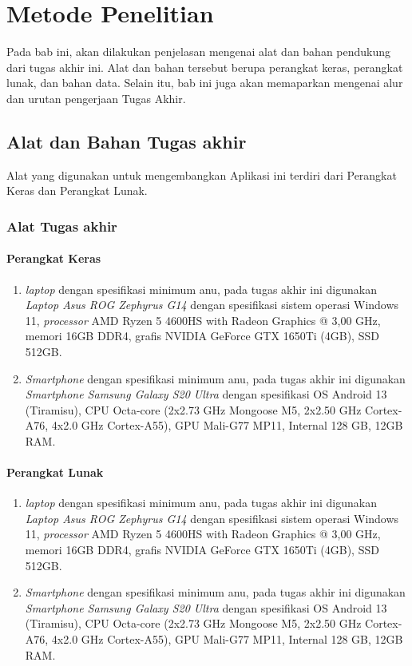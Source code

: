 \chapter{Metode Penelitian}
Pada bab ini, akan dilakukan penjelasan mengenai alat dan bahan pendukung dari tugas akhir ini.
Alat dan bahan tersebut berupa perangkat keras, perangkat lunak, dan bahan data.
Selain itu, bab ini juga akan memaparkan mengenai alur dan urutan pengerjaan Tugas Akhir.
\section{Alat dan Bahan Tugas akhir}
Alat yang digunakan untuk mengembangkan Aplikasi ini terdiri dari Perangkat Keras dan Perangkat Lunak.
\subsection{Alat Tugas akhir}
\subsubsection{Perangkat Keras}
\begin{enumerate}
	\item \textit{laptop} dengan spesifikasi minimum anu, 
	pada tugas akhir ini digunakan \textit{Laptop Asus ROG Zephyrus G14} dengan spesifikasi sistem operasi Windows 11, \textit{processor} AMD Ryzen 5 4600HS with Radeon Graphics @ 3,00 GHz, memori 16GB DDR4, grafis NVIDIA GeForce GTX 1650Ti (4GB), SSD 512GB.
	\item \textit{Smartphone} dengan spesifikasi minimum anu, pada tugas akhir ini digunakan \textit{Smartphone Samsung Galaxy S20 Ultra} dengan spesifikasi OS Android 13 (Tiramisu), CPU Octa-core (2x2.73 GHz Mongoose M5, 2x2.50 GHz Cortex-A76, 4x2.0 GHz Cortex-A55), GPU Mali-G77 MP11, Internal 128 GB, 12GB RAM.
\end{enumerate}

\subsubsection{Perangkat Lunak}
\begin{enumerate}
	\item \textit{laptop} dengan spesifikasi minimum anu, 
	pada tugas akhir ini digunakan \textit{Laptop Asus ROG Zephyrus G14} dengan spesifikasi sistem operasi Windows 11, \textit{processor} AMD Ryzen 5 4600HS with Radeon Graphics @ 3,00 GHz, memori 16GB DDR4, grafis NVIDIA GeForce GTX 1650Ti (4GB), SSD 512GB.
	\item \textit{Smartphone} dengan spesifikasi minimum anu, pada tugas akhir ini digunakan \textit{Smartphone Samsung Galaxy S20 Ultra} dengan spesifikasi OS Android 13 (Tiramisu), CPU Octa-core (2x2.73 GHz Mongoose M5, 2x2.50 GHz Cortex-A76, 4x2.0 GHz Cortex-A55), GPU Mali-G77 MP11, Internal 128 GB, 12GB RAM.
\end{enumerate}
\newpage
